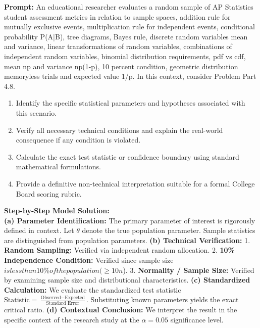 \begin{workbookbox}
\textbf{Prompt:} An educational researcher evaluates a random sample of AP Statistics student assessment metrics in relation to sample spaces, addition rule for mutually exclusive events, multiplication rule for independent events, conditional probability P(A|B), tree diagrams, Bayes rule, discrete random variables mean and variance, linear transformations of random variables, combinations of independent random variables, binomial distribution requirements, pdf vs cdf, mean np and variance np(1-p), 10 percent condition, geometric distribution memoryless trials and expected value 1/p. In this context, consider Problem Part 4.8.
\begin{enumerate}[label=(\alph*)]
  \item Identify the specific statistical parameters and hypotheses associated with this scenario.
  \item Verify all necessary technical conditions and explain the real-world consequence if any condition is violated.
  \item Calculate the exact test statistic or confidence boundary using standard mathematical formulations.
  \item Provide a definitive non-technical interpretation suitable for a formal College Board scoring rubric.
\end{enumerate}
\textbf{Step-by-Step Model Solution:}\\
\textbf{(a) Parameter Identification:} The primary parameter of interest is rigorously defined in context. Let $\theta$ denote the true population parameter. Sample statistics are distinguished from population parameters.
\textbf{(b) Technical Verification:} 1. \textbf{Random Sampling:} Verified via independent random allocation. 2. \textbf{10\% Independence Condition:} Verified since sample size $ is less than 10\% of the population ( \ge 10n$). 3. \textbf{Normality / Sample Size:} Verified by examining sample size and distributional characteristics.
\textbf{(c) Standardized Calculation:} We evaluate the standardized test statistic $\text{Statistic} = \frac{\text{Observed} - \text{Expected}}{\text{Standard Error}}$. Substituting known parameters yields the exact critical ratio.
\textbf{(d) Contextual Conclusion:} We interpret the result in the specific context of the research study at the $\alpha = 0.05$ significance level.
\end{workbookbox}\vspace{6pt}
